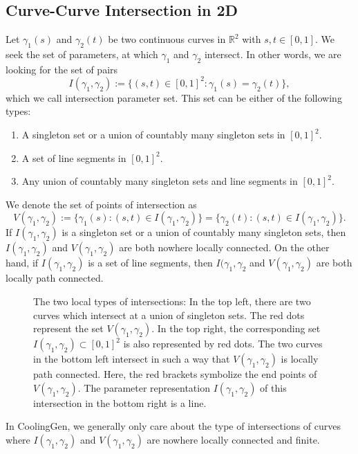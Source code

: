 \documentclass[a4paper, 11pt]{report}
\theoremstyle{definition}
\begin{document}
\subsection{Curve-Curve Intersection in 2D}
	Let $\gamma_1(s)$ and $\gamma_2(t)$ be two continuous curves in $\mathbb{R}^2$ with $s,t \in [0,1]$. We seek the set of parameters, at which $\gamma_1$ and $\gamma_2$ intersect. In other words, we are looking for the set of pairs
		$$ I(\gamma_1, \gamma_2) := \{(s,t) \in [0,1]^2 : \gamma_1(s) = \gamma_2(t)\}, $$
	which we call intersection parameter set. This set can be either of the following types:
	\begin{enumerate}
		\item A singleton set or a union of countably many singleton sets in $[0,1]^2$.
		\item A set of line segments in $[0,1]^2$.
		\item Any union of countably many singleton sets and line segments in $[0,1]^2$.
	\end{enumerate}
	We denote the set of points of intersection as
		$$ V(\gamma_1, \gamma_2) := \{\gamma_1(s): (s, t) \in I(\gamma_1, \gamma_2)\} = \{\gamma_2(t): (s, t) \in I(\gamma_1, \gamma_2)\}.$$
	If $I(\gamma_1, \gamma_2)$ is a singleton set or a union of countably many singleton sets, then $I(\gamma_1, \gamma_2)$ and $V(\gamma_1, \gamma_2)$ are both nowhere locally connected. On the other hand, if $I(\gamma_1, \gamma_2)$ is a set of line segments, then $I(\gamma_1, \gamma_2$ and $V(\gamma_1, \gamma_2)$ are both locally path connected.

	\begin{figure}[H]
		\label{fig:curveIntersectionConnectedness}
		\centering
		
		\caption{The two local types of intersections: In the top left, there are two curves which intersect at a union of singleton sets. The red dots represent the set $V(\gamma_1, \gamma_2)$. In the top right, the corresponding set $I(\gamma_1, \gamma_2) \subset [0,1]^2$ is also represented by red dots. The two curves in the bottom left intersect in such a way that $V(\gamma_1, \gamma_2)$ is locally path connected. Here, the red brackets symbolize the end points of $V(\gamma_1, \gamma_2)$. The parameter representation $I(\gamma_1, \gamma_2)$ of this intersection in the bottom right is a line.}
	\end{figure}

	In CoolingGen, we generally only care about the type of intersections of curves where $I(\gamma_1, \gamma_2)$ and $V(\gamma_1, \gamma_2)$ are nowhere locally connected and finite.
	
\end{document}

